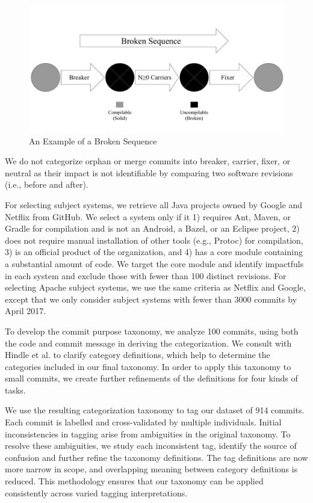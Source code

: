 \begin{figure}[htbp]
    \centerline{\includegraphics[scale=0.3]{figures/sequence.pdf}}
    \caption{An Example of a Broken Sequence}
    \label{fig:sequence}
    \end{figure}

We do not categorize orphan or merge commits into breaker, carrier, fixer, or neutral as their impact is not identifiable by comparing two software revisions (i.e., before and after).

For selecting subject systems, we retrieve all Java projects owned by Google and Netflix from GitHub.
We select a system only if it 1) requires Ant, Maven, or Gradle for compilation and is not an Android, a Bazel, or an Eclipse project, 2) does not require manual installation of other tools (e.g., Protoc) for compilation, 3) is an official product of the organization, and 4) has a core module containing a substantial amount of code.
We target the core module and identify impactfuls in each system and exclude those with fewer than 100 distinct revisions.
For selecting Apache subject systems, we use the same criteria as Netflix and Google, except that we only consider subject systems with fewer than 3000 commits by April 2017.

To develop the commit purpose taxonomy, we analyze 100 commits, using both the code and commit message in deriving the categorization. We consult with Hindle et al. to clarify category definitions, which help to determine the categories included in our final taxonomy. 
In order to apply this taxonomy to small commits, we create further refinements of the definitions for four kinds of tasks. 

We use the resulting categorization taxonomy to tag our dataset of 914 commits. Each commit is labelled and cross-validated by multiple individuals. 
Initial inconsistencies in tagging arise from ambiguities in the original taxonomy. 
To resolve these ambiguities, we study each inconsistent tag, identify the source of confusion and further refine the taxonomy definitions. 
The tag definitions are now more narrow in scope, and overlapping meaning between category definitions is reduced. 
This methodology ensures that our taxonomy can be applied consistently across varied tagging interpretations. 


